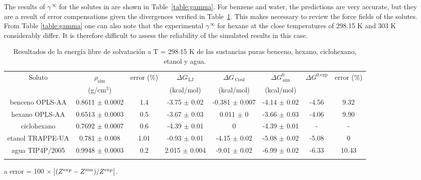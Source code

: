 \documentclass[3p,twocolumn]{elsarticle}
\begin{document}
The results of $\gamma^{\, \infty}$ for the solutes in \ce{[emim][B(CN)_4]} are shown in Table~\ref{table:gamma}. For benzene and water, the predictions are very accurate, but they are a result of error compensations given the divergences verified in Table~\ref{table:mu_solutos}. This makes necessary to review the force fields of the solutes. From Table \ref{table:gamma} one can also note that the experimental $\gamma^{\, \infty}$ for hexane at the close temperatures of 298.15 K and 303 K considerably differ. It is therefore difficult to assess the reliability of the simulated results in this case.

\begin{table}
\centering
\begin{adjustbox}{width=1\textwidth}
\begin{threeparttable}
\caption{Resultados de la energía libre de solvatación a T = 298.15 K de las sustancias puras benceno, hexano, ciclohexano, etanol y agua.}
\begin{tabular}{ c c c c c c c c }
\toprule
Soluto & $\rho_{\text{sim}}$ & error (\%)\tnote{a} & $\Delta G_{\,\text{LJ}}$  & $\Delta G_{\,\text{Coul}}$  & $\Delta G^{0}_{\,\text{sim}}$ & $\Delta G^{\text{0,exp}}$   & error (\%)\tnote{a}\\
 & (g/cm$^{3}$) &  & (kcal/mol) &  (kcal/mol) &  (kcal/mol)   &  \\
\hline
benceno OPLS-AA   & 0.8611 $\pm$ 0.0002 & 1.4 & -3.75  $\pm$ 0.02 & -0.381 $\pm$ 0.007 & -4.14 $\pm$ 0.02 & -4.56 & 9.32  \\
hexano OPLS-AA    & 0.6513 $\pm$ 0.0003 & 0.5 & -3.67  $\pm$  0.03 & 0.011 $\pm$ 0 & -3.66 $\pm$ 0.03 & -4.06 & 9.90 \\
ciclohexano & 0.7692 $\pm$ 0.0007 & 0.6 & -4.39 $\pm$ 0.01 & 0 & -4.39 $\pm$ 0.01 & - & -  \\
etanol TRAPPE-UA   & 0.781 $\pm$ 0.008 & 1.01  &-0.93 $\pm$ 0.01 & -4.15 $\pm$ 0.02  & -5.08  $\pm$ 0.02  & -5.08 & 0 \\
agua TIP4P/2005   &  0.9948 $\pm$ 0.0003 & 0.2 & 2.015 $\pm$ 0.004 & -9.01 $\pm$ 0.02 & -6.99 $\pm$ 0.02 & -6.33  &10.43 \\
 \bottomrule
\label{table:mu_solutos} 
\end{tabular}
\begin{tablenotes}
\item[a] error = 100 $\times$ $\abs{(Z^{\text{exp}} - Z^{\text{sim}})/Z^{\text{exp}}}$.
\end{tablenotes}
\end{threeparttable}
\end{adjustbox}
\end{table}
\end{document}
